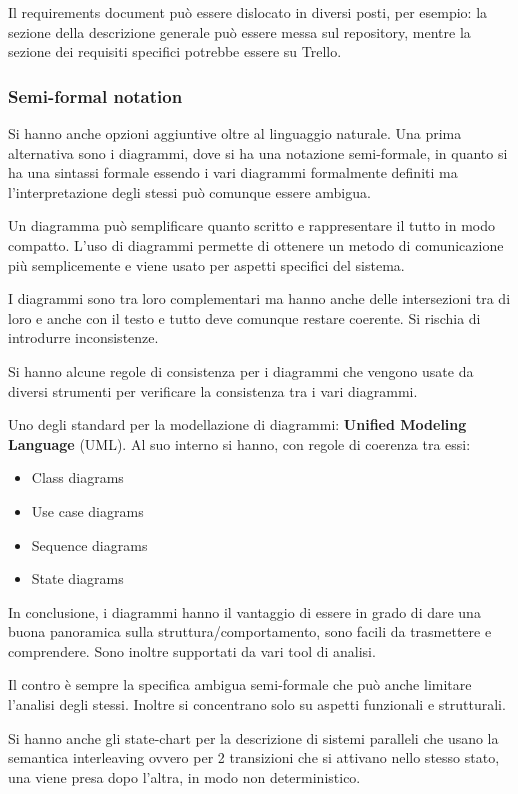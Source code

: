 Il requirements document può essere dislocato in diversi posti, per esempio:
la sezione della descrizione generale può essere messa sul repository, mentre
la sezione dei requisiti specifici potrebbe essere su Trello.
\subsubsection{Semi-formal notation}
Si hanno anche opzioni aggiuntive oltre al linguaggio naturale. Una prima
alternativa sono i diagrammi, dove si ha una notazione semi-formale, in quanto
si ha una sintassi formale essendo i vari diagrammi formalmente definiti ma
l'interpretazione degli stessi può comunque essere ambigua.

Un diagramma può semplificare  quanto scritto e rappresentare il tutto in modo
compatto. L'uso di diagrammi permette di ottenere un metodo di comunicazione più
semplicemente e viene usato per aspetti specifici del sistema.

I diagrammi sono tra loro complementari ma hanno anche delle intersezioni tra di
loro e anche con il testo e tutto deve comunque restare coerente. Si rischia di
introdurre inconsistenze.

Si hanno alcune regole di consistenza per i diagrammi che vengono usate da diversi
strumenti per verificare la consistenza tra i vari diagrammi.

Uno degli standard per la modellazione di diagrammi: \textbf{Unified Modeling
      Language} (UML). Al suo interno si hanno, con regole di coerenza tra essi:
\begin{itemize}
      \item Class diagrams
      \item Use case diagrams
      \item Sequence diagrams
      \item State diagrams
\end{itemize}
In conclusione, i diagrammi hanno il vantaggio di essere in grado di dare una
buona panoramica sulla struttura/comportamento, sono facili da trasmettere e
comprendere. Sono inoltre supportati da vari tool di analisi.

Il contro è sempre la specifica ambigua semi-formale che può anche limitare
l'analisi degli stessi. Inoltre si concentrano solo su aspetti funzionali e
strutturali.

Si hanno anche gli state-chart per la descrizione di sistemi paralleli che usano
la semantica interleaving ovvero per 2 transizioni che si attivano nello stesso
stato, una viene presa dopo l'altra, in modo non deterministico.
